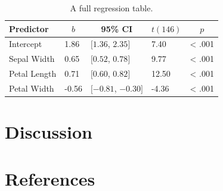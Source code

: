 \documentclass[
  english,
  man,draftall]{apa6}
\newenvironment{cslreferences}%
  {}%
  {\par}
\begin{document}
\begin{table}[tbp]

\begin{center}
\begin{threeparttable}

\caption{\label{tab:unnamed-chunk-7}A full regression table.}

\begin{tabular}{lllll}
\toprule
Predictor & \multicolumn{1}{c}{$b$} & \multicolumn{1}{c}{95\% CI} & \multicolumn{1}{c}{$t(146)$} & \multicolumn{1}{c}{$p$}\\
\midrule
Intercept & 1.86 & $[1.36$, $2.35]$ & 7.40 & < .001\\
Sepal Width & 0.65 & $[0.52$, $0.78]$ & 9.77 & < .001\\
Petal Length & 0.71 & $[0.60$, $0.82]$ & 12.50 & < .001\\
Petal Width & -0.56 & $[-0.81$, $-0.30]$ & -4.36 & < .001\\
\bottomrule
\end{tabular}

\end{threeparttable}
\end{center}

\end{table}

\hypertarget{discussion}{%
\section{Discussion}\label{discussion}}

\newpage

\hypertarget{references}{%
\section{References}\label{references}}

\begingroup
\setlength{\parindent}{-0.5in}
\setlength{\leftskip}{0.5in}

\hypertarget{refs}{}
\begin{cslreferences}
\end{cslreferences}

\endgroup
\end{document}
